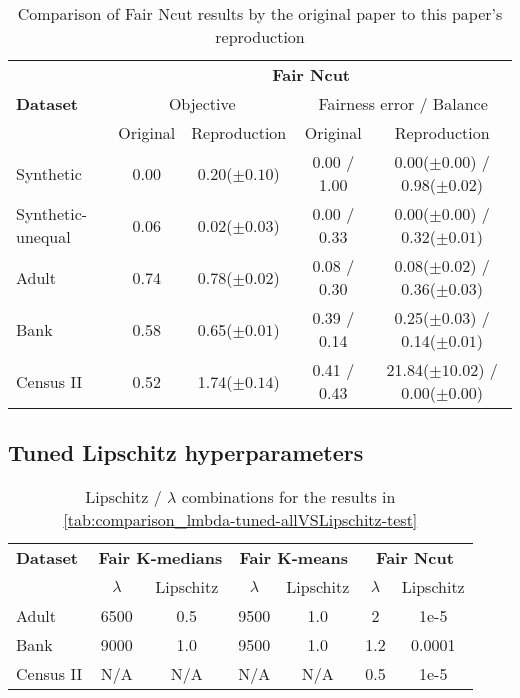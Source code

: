 \begin{table}[H]
    \centering
    \begin{tabular}{|l|c|c|c|c|}
        \hline
            & \multicolumn{4}{c|}{\textbf{Fair Ncut}} \\
            \cline{2-5}
        \textbf{Dataset} & \multicolumn{2}{c|}{Objective} &   \multicolumn{2}{c|}{Fairness error / Balance} \\ \cline{2-5}
        & Original & Reproduction & Original & Reproduction \\
        \hline
        Synthetic & \color{red}0.00\color{black} & 0.20($\pm 0.10$) & 0.00 / \color{red}1.00\color{black} & 0.00($\pm 0.00$) / 0.98($\pm 0.02$) \\
        Synthetic-unequal & 0.06 & 0.02($\pm 0.03$) & 0.00 / \color{red}0.33\color{black} & 0.00($\pm 0.00$) / 0.32($\pm 0.01$) \\
        Adult & \color{red}0.74\color{black} & 0.78($\pm 0.02$) & 0.08 / 0.30 & 0.08($\pm 0.02$) / 0.36($\pm 0.03$) \\
        Bank & \color{red}0.58\color{black} & 0.65($\pm 0.01$) & 0.39 / 0.14 & 0.25($\pm 0.03$) / 0.14($\pm 0.01$) \\
        Census II & \color{red}0.52\color{black} & 1.74($\pm 0.14$) & \color{red}0.41\color{black} / \color{red}0.43\color{black} & 21.84($\pm 10.02$) / 0.00($\pm 0.00$) \\
        \hline
    \end{tabular}
    \caption{Comparison of Fair Ncut results by the original paper to this paper's reproduction}
    \label{tab:comparison_originalVSreproduction_ncut}
\end{table}

\subsection*{Tuned Lipschitz hyperparameters}

\begin{table}[H]
    \centering
    \begin{tabular}{|l|c|c|c|c|c|c|}
        \hline
        \textbf{Dataset} & \multicolumn{2}{c|}{\textbf{Fair $\boldsymbol{K}$-medians}} & \multicolumn{2}{c|}{\textbf{Fair $\boldsymbol{K}$-means}} & \multicolumn{2}{c|}{\textbf{Fair Ncut}} \\
            \cline{2-7}
        & $\lambda$ & Lipschitz & $\lambda$ & Lipschitz & $\lambda$ & Lipschitz \\
        \hline
        Adult & 6500 & 0.5 & 9500 & 1.0 & 2 & 1e-5 \\
        Bank & 9000 & 1.0 & 9500 & 1.0 & 1.2 & 0.0001 \\
        Census II & N/A & N/A & N/A & N/A & 0.5 & 1e-5 \\
        \hline
    \end{tabular}
    \caption{Lipschitz / $\lambda$ combinations for the results in \autoref{tab:comparison_lmbda-tuned-allVSLipschitz-test}}
    \label{tab:hyperparam_Lipschitz}
\end{table}


